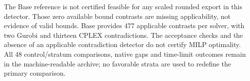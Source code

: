 The Base reference is not certified feasible for any scaled rounded export in
this detector. Those zero available bound contrasts are missing applicability,
not evidence of valid bounds. Base provides 477 applicable contrasts per
solver, with two Gurobi and thirteen CPLEX contradictions. The acceptance checks
and the absence of an applicable contradiction detector do not certify MILP
optimality. All 48 control/stratum comparisons, native gaps and time-limit
outcomes remain in the machine-readable archive; no favorable strata are used
to redefine the primary comparison.
